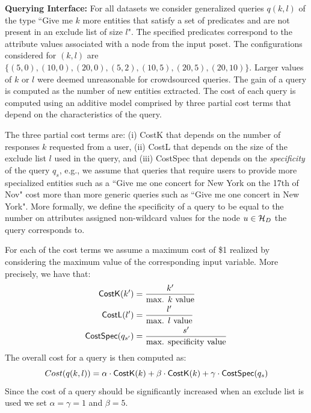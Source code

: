 \vspace{5pt}\noindent\textbf{Querying Interface:} For all datasets we consider generalized queries $q(k,l)$ of the type ``Give me $k$ more entities that satisfy a set of predicates and are not present in an exclude list of size $l$". The specified predicates correspond to the attribute values associated with a node from the input poset. The  configurations considered for $(k,l)$ are $\{(5,0), (10,0), (20,0), (5,2), (10,5), (20,5), (20,10)\}$. Larger values of $k$ or $l$ were deemed unreasonable for crowdsourced queries. The gain of a query is computed as the number of new entities extracted. The cost of each query is computed using an additive model comprised by three partial cost terms that depend on the characteristics of the query. 

The three partial cost terms are: (i) {\sf CostK} that depends on the number of responses $k$ requested from a user, (ii) {\sf CostL} that depends on the size of the exclude list $l$ used in the query, and (iii) {\sf CostSpec} that depends on the {\em specificity} of the query $q_s$, e.g., we assume that queries that require users to provide more specialized entities such as a ``Give me one concert for New York on the 17th of Nov" cost more than more generic queries such as ``Give me one concert in New York". More formally, we define the specificity of a query to be equal to the number on attributes assigned non-wildcard values for the node $u \in \mathcal{H}_D$ the query corresponds to. 

For each of the cost terms we assume a maximum cost of \$1 realized by considering the maximum value of the corresponding input variable. More precisely, we have that:
\begin{align}
{\sf CostK}(k^{\prime}) &= \frac{k^{\prime}}{\mbox{max. $k$ value}} \nonumber \\
{\sf CostL}(l^{\prime}) &= \frac{l^{\prime}}{\mbox{max. $l$ value}} \nonumber \\
{\sf CostSpec}(q_{s^{\prime}}) &= \frac{s^{\prime}}{\mbox{max. specificity value}} \nonumber
\end{align}
The overall cost for a query is then computed as:
\begin{equation}
Cost(q(k,l)) = \alpha \cdot {\sf CostK}(k) + \beta \cdot  {\sf CostK}(k) + \gamma \cdot  {\sf CostSpec}(q_s) \nonumber
\end{equation}
Since the cost of a query should be significantly increased when an exclude list is used we set $\alpha = \gamma = 1$ and $\beta = 5$. 

